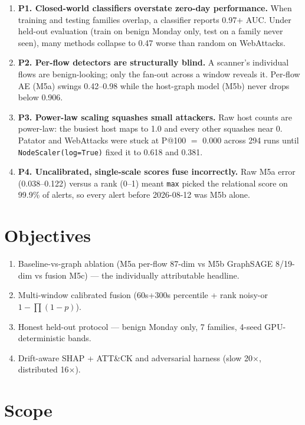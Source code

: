 \documentclass[12pt,a4paper,oneside]{report}
\begin{document}
\begin{enumerate}[leftmargin=*,itemsep=2pt]
\item \textbf{P1. Closed-world classifiers overstate zero-day performance.} When training and testing families overlap, a classifier reports 0.97+ AUC. Under held-out evaluation (train on benign Monday only, test on a family never seen), many methods collapse to 0.47 worse than random on WebAttacks.
\item \textbf{P2. Per-flow detectors are structurally blind.} A scanner's individual flows are benign-looking; only the fan-out across a window reveals it. Per-flow AE (M5a) swings 0.42--0.98 while the host-graph model (M5b) never drops below 0.906.
\item \textbf{P3. Power-law scaling squashes small attackers.} Raw host counts are power-law: the busiest host maps to 1.0 and every other squashes near 0. Patator and WebAttacks were stuck at P@100 $=$ 0.000 across 294 runs until \texttt{NodeScaler(log=True)} fixed it to 0.618 and 0.381.
\item \textbf{P4. Uncalibrated, single-scale scores fuse incorrectly.} Raw M5a error (0.038--0.122) versus a rank (0--1) meant \texttt{max} picked the relational score on 99.9\% of alerts, so every alert before 2026-08-12 was M5b alone.
\end{enumerate}

\section{Objectives}
\begin{enumerate}[leftmargin=*,itemsep=2pt]
\item Baseline-vs-graph ablation (M5a per-flow 87-dim vs M5b GraphSAGE 8/19-dim vs fusion M5c) — the individually attributable headline.
\item Multi-window calibrated fusion (60s+300s percentile + rank noisy-or $1-\prod(1-p)$).
\item Honest held-out protocol — benign Monday only, 7 families, 4-seed GPU-deterministic bands.
\item Drift-aware SHAP + ATT\&CK and adversarial harness (slow 20$\times$, distributed 16$\times$).
\end{enumerate}

\section{Scope}
\end{document}
